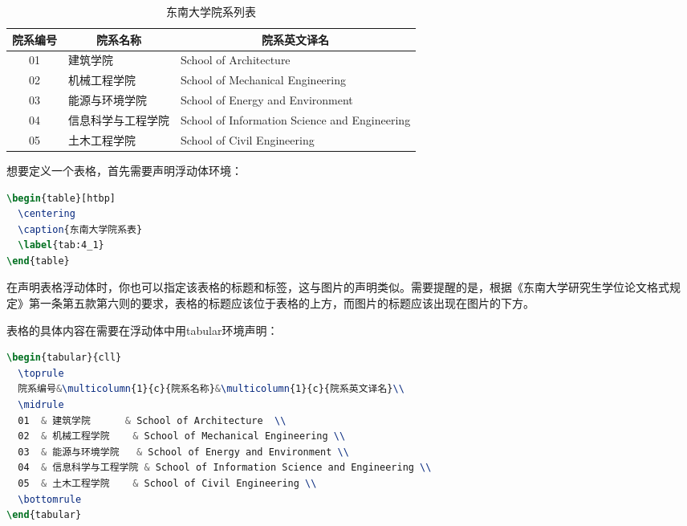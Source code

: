 \begin{table}[htbp]
\centering
\caption{东南大学院系列表}
\label{tab:4_1}
\begin{tabular}{cll}
\toprule
院系编号 & \multicolumn{1}{c}{院系名称}       & \multicolumn{1}{c}{院系英文译名 }     \\
\midrule
01                       & 建筑学院      & School of Architecture                        \\
02                       & 机械工程学院    & School of Mechanical Engineering              \\
03                       & 能源与环境学院   & School of Energy and Environment              \\
04                       & 信息科学与工程学院 & School of Information Science and Engineering \\
05                       & 土木工程学院    & School of Civil Engineering \\
\bottomrule
\end{tabular}
\end{table}

\noindent 想要定义一个表格，首先需要声明浮动体环境：

\begin{tcolorbox}
\begin{lstlisting}[language=TeX]
\begin{table}[htbp]
  \centering
  \caption{东南大学院系表}
  \label{tab:4_1}
\end{table}
\end{lstlisting}
\end{tcolorbox}

\noindent 在声明表格浮动体时，你也可以指定该表格的标题和标签，这与图片的声明类似。需要提醒的是，根据《东南大学研究生学位论文格式规定》\cite{seugs2015rule}第一条第五款第六则的要求，表格的标题应该位于表格的上方，而图片的标题应该出现在图片的下方。

表格的具体内容在需要在浮动体中用{\codefont tabular}环境声明：

\begin{tcolorbox}
\begin{lstlisting}[language=TeX]
\begin{tabular}{cll}
  \toprule
  院系编号&\multicolumn{1}{c}{院系名称}&\multicolumn{1}{c}{院系英文译名}\\
  \midrule
  01  & 建筑学院      & School of Architecture  \\
  02  & 机械工程学院    & School of Mechanical Engineering \\
  03  & 能源与环境学院   & School of Energy and Environment \\
  04  & 信息科学与工程学院 & School of Information Science and Engineering \\
  05  & 土木工程学院    & School of Civil Engineering \\
  \bottomrule
\end{tabular}
\end{lstlisting}
\end{tcolorbox}

